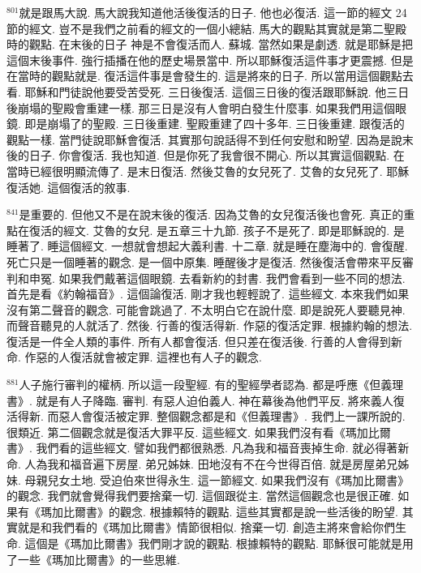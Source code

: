 \documentclass{book}
\begin{document}
$^{801}$就是跟馬大說.
馬大說我知道他活後復活的日子.
他也必復活.
這一節的經文 24節的經文.
豈不是我們之前看的經文的一個小總結.
馬大的觀點其實就是第二聖殿時的觀點.
在末後的日子 神是不會復活而人.
蘇城.
當然如果是劇透.
就是耶穌是把這個末後事件.
強行插播在他的歷史場景當中.
所以耶穌復活這件事才更震撼.
但是在當時的觀點就是.
復活這件事是會發生的.
這是將來的日子.
所以當用這個觀點去看.
耶穌和門徒說他要受苦受死.
三日後復活.
這個三日後的復活跟耶穌說.
他三日後崩塌的聖殿會重建一樣.
那三日是沒有人會明白發生什麼事.
如果我們用這個眼鏡.
即是崩塌了的聖殿.
三日後重建.
聖殿重建了四十多年.
三日後重建.
跟復活的觀點一樣.
當門徒說耶穌會復活.
其實那句說話得不到任何安慰和盼望.
因為是說末後的日子.
你會復活.
我也知道.
但是你死了我會很不開心.
所以其實這個觀點.
在當時已經很明顯流傳了.
是末日復活.
然後艾魯的女兒死了.
艾魯的女兒死了.
耶穌復活她.
這個復活的敘事.

$^{841}$是重要的.
但他又不是在說末後的復活.
因為艾魯的女兒復活後也會死.
真正的重點在復活的經文.
艾魯的女兒.
是五章三十九節.
孩子不是死了.
即是耶穌說的.
是睡著了.
睡這個經文.
一想就會想起大義利書.
十二章.
就是睡在塵海中的.
會復醒.
死亡只是一個睡著的觀念.
是一個中原集.
睡醒後才是復活.
然後復活會帶來平反審判和申冤.
如果我們戴著這個眼鏡.
去看新約的封書.
我們會看到一些不同的想法.
首先是看《約翰福音》.
這個論復活.
剛才我也輕輕說了.
這些經文.
本來我們如果沒有第二聲音的觀念.
可能會跳過了.
不太明白它在說什麼.
即是說死人要聽見神.
而聲音聽見的人就活了.
然後.
行善的復活得新.
作惡的復活定罪.
根據約翰的想法.
復活是一件全人類的事件.
所有人都會復活.
但只差在復活後.
行善的人會得到新命.
作惡的人復活就會被定罪.
這裡也有人子的觀念.

$^{881}$人子施行審判的權柄.
所以這一段聖經.
有的聖經學者認為.
都是呼應《但義理書》.
就是有人子降臨.
審判.
有惡人迫伯義人.
神在幕後為他們平反.
將來義人復活得新.
而惡人會復活被定罪.
整個觀念都是和《但義理書》.
我們上一課所說的.
很類近.
第二個觀念就是復活大罪平反.
這些經文.
如果我們沒有看《瑪加比爾書》.
我們看的這些經文.
譬如我們都很熟悉.
凡為我和福音喪掉生命.
就必得著新命.
人為我和福音遍下房屋.
弟兄姊妹.
田地沒有不在今世得百倍.
就是房屋弟兄姊妹.
母親兒女土地.
受迫伯來世得永生.
這一節經文.
如果我們沒有《瑪加比爾書》的觀念.
我們就會覺得我們要捨棄一切.
這個跟從主.
當然這個觀念也是很正確.
如果有《瑪加比爾書》的觀念.
根據賴特的觀點.
這些其實都是說一些活後的盼望.
其實就是和我們看的《瑪加比爾書》情節很相似.
捨棄一切.
創造主將來會給你們生命.
這個是《瑪加比爾書》我們剛才說的觀點.
根據賴特的觀點.
耶穌很可能就是用了一些《瑪加比爾書》的一些思維.
\end{document}
